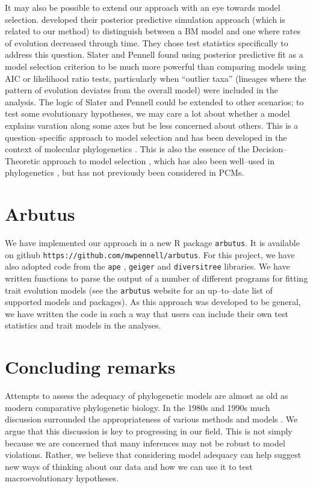 \documentclass[a4paper,11pt]{article}
\begin{document}
It may also be possible to extend our approach with an eye towards model selection. \citet{SlaterPennell} developed their posterior predictive simulation approach (which is related to our method) to distinguish between a BM model and one where rates of evolution decreased through time. They chose test statistics specifically to address this question. Slater and Pennell found using posterior predictive fit as a model selection criterion to be much more powerful than comparing models using AIC or likelihood ratio tests, particularly when ``outlier taxa'' (lineages where the pattern of evolution deviates from the overall model) were included in the analysis. The logic of Slater and Pennell could be extended to other scenarios; to test some evolutionary hypotheses, we may care a lot about whether a model explains varation along some axes but be less concerned about others. This is a question--specific approach to model selection and has been developed in the context of molecular phylogenetics \citep{Bollback2002, Lewis2013}. This is also the essence of the Decision--Theoretic approach to model selection \citep{Robert2007}, which has also been well--used in phylogenetics \citep{Minin2003}, but has not previously been considered in PCMs.


\section{Arbutus}

We have implemented our approach in a new R package \texttt{arbutus}. It is available on github \texttt{https://github.com/mwpennell/arbutus}. For this project, we have also adopted code from the \texttt{ape} \citep{ape}, \texttt{geiger} \citep{geiger2} and \texttt{diversitree} \citep{FitzJohn2012} libraries. We have written functions to parse the output of a number of different programs for fitting trait evolution models (see the \texttt{arbutus} website for an up--to--date list of supported models and packages). As this approach was developed to be general, we have written the code in such a way that users can include their own test statistics and trait models in the analyses.

\section{Concluding remarks}
Attempts to assess the adequacy of phylogenetic models are almost as old as modern comparative phylogenetic biology. In the 1980s and 1990s much discussion surrounded the appropriateness of various methods and models \citep{Felsenstein1985, Felsenstein1988, HarveyPagel1991, Garland1992, Diaz1996, Price1997, Garland1999, GarlandIves2000}. We argue that this discussion is key to progressing in our field. This is not simply because we are concerned that many inferences may not be robust to model violations. Rather, we believe that considering model adequacy can help suggest new ways of thinking about our data and how we can use it to test macroevolutionary hypotheses.
\end{document}
